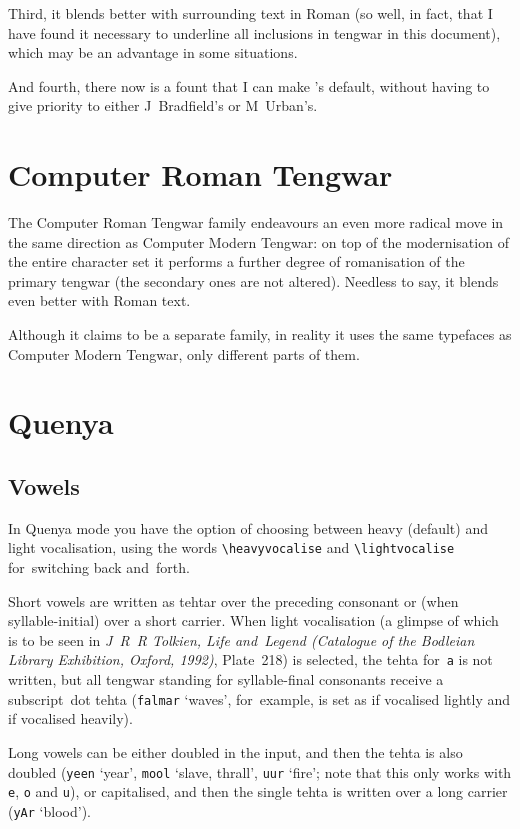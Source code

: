 \documentclass{article}
\newif \ifcmteng \cmtengtrue
\newcommand\book[1]{{\sl#1}\/}
\newcommand\quet[1]{%
  \ifcmteng \underline {\quetta{#1}}\else \quetta{#1}\fi}
\newcommand\queng[1]{{\tt#1} \quet{#1}}
\begin{document}
Third, it blends better with surrounding text in Roman
(so well, in fact, that I have found it necessary
to underline all inclusions in tengwar in this document),
which may be an advantage in some situations.

And fourth, there now is a fount that I can make
\TengTeX's default, without having to give priority
to either J~Bradfield's or M~Urban's.

\section{Computer Roman Tengwar}

The Computer Roman Tengwar family endeavours an even more radical move
in the same direction as Computer Modern Tengwar:
on top of the modernisation of the entire character set
it performs a further degree of romanisation of the primary tengwar
(the secondary ones are not altered).
Needless to say, it blends even better with Roman text.

Although it claims to be a separate family, in reality it uses the same
typefaces as Computer Modern Tengwar, only different parts of them.

\section{Quenya}\quenya

\subsection{Vowels}

In Quenya mode you have the option of choosing between heavy (default)
and light vocalisation, using the words \verb!\heavyvocalise! and
\verb!\lightvocalise! for~switching back and~forth.

Short vowels are written as tehtar over the preceding consonant or
(when syllable-initial) over a short carrier. When light vocalisation
(a glimpse of which is to be seen in \book{J~R~R Tolkien, Life
  and~Legend (Catalogue of the Bodleian Library Exhibition, Oxford,
  1992)}, Plate~218) is selected, the tehta for~{\tt a} is not
written, but all tengwar standing for syllable-final consonants
receive a subscript~dot tehta ({\tt falmar} `waves', for~example,
is set as \quet{\lightvocalise falmar} if vocalised lightly and
\quet{falmar} if vocalised heavily).

Long vowels can be either doubled in the input, and then the tehta is
also doubled (\queng{yeen} `year', \queng{mool} `slave, thrall',
\queng{uur} `fire'; note that this only works with {\tt e}, {\tt o}
and {\tt u}), or capitalised, and then the single tehta is written
over a long carrier (\queng{yAr} `blood').
\end{document}
